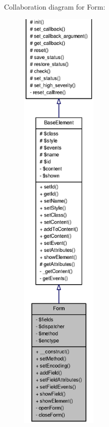Collaboration diagram for Form:\nopagebreak
\begin{figure}[H]
\begin{center}
\leavevmode
\includegraphics[height=600pt]{classForm__coll__graph}
\end{center}
\end{figure}
